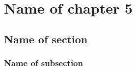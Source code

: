 

\graphicspath{{5/figures/}} %


\chapter{\label{ch5}Name of chapter 5} %

\section{\label{5:1}Name of section}

\subsection{\label{5:1:1}Name of subsection}




